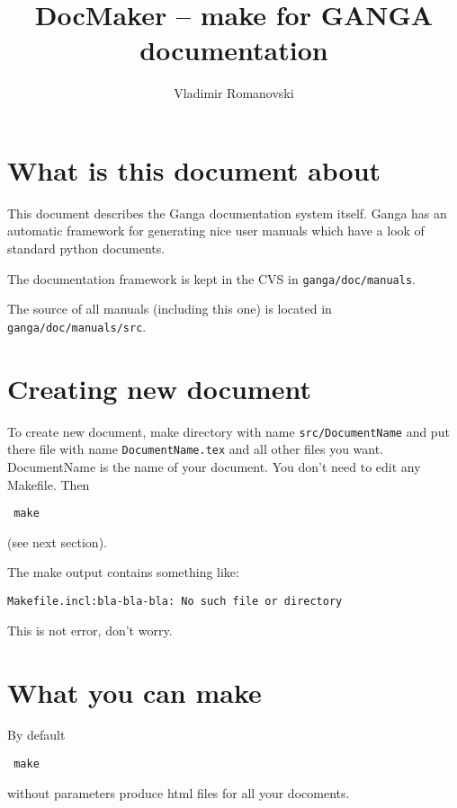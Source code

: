 \documentclass{howto}
\title{DocMaker -- make for GANGA documentation}
\author{Vladimir Romanovski}
\begin{document}
\maketitle
\tableofcontents

\section{What is this document about}

This document describes the  Ganga documentation system itself.  Ganga
has an automatic framework for generating nice user manuals which have
a look of standard python documents.

The documentation framework is kept in the CVS in {\tt ganga/doc/manuals}.

The  source of all  manuals (including  this one)  is located  in {\tt
ganga/doc/manuals/src}.


\section{Creating new document}

To create new document, make directory with name {\tt src/DocumentName}
and put there file with name {\tt DocumentName.tex} and all other files
you want.  DocumentName  is the name of your  document. You don't need
to edit any Makefile.   Then \begin{verbatim} make \end{verbatim} (see
next section).


The make output contains something like:
\begin{verbatim}
Makefile.incl:bla-bla-bla: No such file or directory
\end{verbatim}
This is not error, don't worry.

\section{What you can make}

By default \begin{verbatim} make \end{verbatim} without parameters produce html
files for all your docoments.
\end{document}
